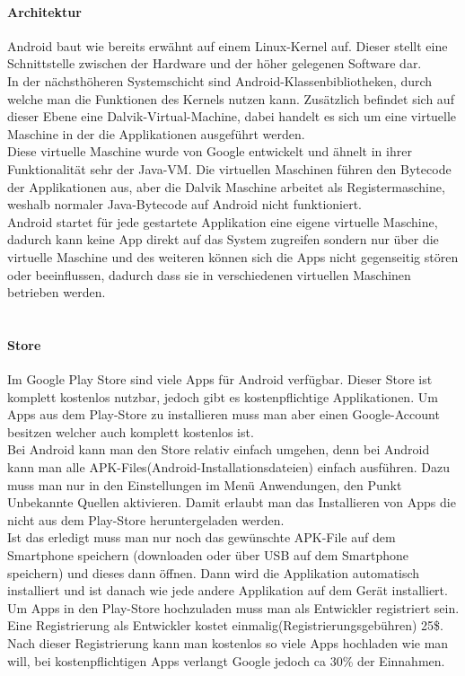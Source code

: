 \paragraph*{Architektur\\}
Android baut wie bereits erwähnt auf einem Linux-Kernel auf.  Dieser stellt eine Schnittstelle zwischen der Hardware und der höher gelegenen Software dar.\\
In der nächsthöheren Systemschicht sind Android-Klassenbibliotheken, durch welche man die Funktionen des Kernels nutzen kann. Zusätzlich befindet sich auf dieser Ebene eine Dalvik-Virtual-Machine, dabei handelt es sich um eine virtuelle Maschine in der die Applikationen ausgeführt werden.\\
Diese virtuelle Maschine wurde von Google entwickelt und ähnelt in ihrer Funktionalität sehr der Java-VM. Die virtuellen Maschinen führen den Bytecode der Applikationen aus, aber die Dalvik Maschine arbeitet als Registermaschine, weshalb normaler Java-Bytecode auf Android nicht funktioniert.\\
Android startet für jede gestartete Applikation eine eigene virtuelle Maschine, dadurch kann keine App direkt auf das System zugreifen sondern nur über die virtuelle Maschine und des weiteren können sich die Apps nicht gegenseitig stören oder beeinflussen, dadurch dass sie in verschiedenen virtuellen Maschinen betrieben werden.\\
\\
\paragraph*{Store\\}
Im Google Play Store sind viele Apps für Android verfügbar. Dieser Store ist komplett kostenlos nutzbar, jedoch gibt es kostenpflichtige Applikationen. Um Apps aus dem Play-Store zu installieren muss man aber einen Google-Account besitzen welcher auch komplett kostenlos ist.\\
Bei Android kann man den Store relativ einfach umgehen, denn bei Android kann man alle APK-Files(Android-Installationsdateien) einfach ausführen. Dazu muss man nur in den Einstellungen im Menü Anwendungen, den Punkt Unbekannte Quellen aktivieren. Damit erlaubt man das Installieren von Apps die nicht aus dem Play-Store heruntergeladen werden.\\
Ist das erledigt muss man nur noch das gewünschte APK-File auf dem Smartphone speichern (downloaden oder über USB auf dem Smartphone speichern) und dieses dann öffnen. Dann wird die Applikation automatisch installiert und ist danach wie jede andere Applikation auf dem Gerät installiert.\\
 Um Apps in den Play-Store hochzuladen muss man als Entwickler registriert sein. Eine Registrierung als Entwickler kostet einmalig(Registrierungsgebühren) 25\$. Nach dieser Registrierung kann man kostenlos so viele Apps hochladen wie man will, bei kostenpflichtigen Apps verlangt Google jedoch ca 30\% der Einnahmen.\\



